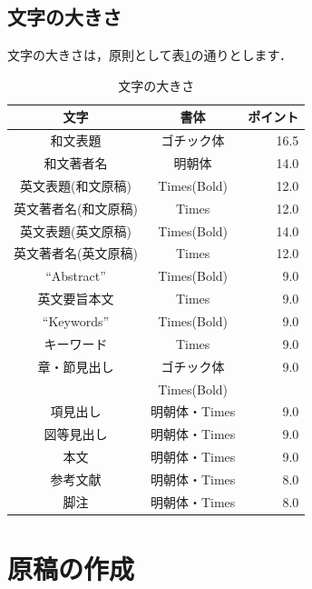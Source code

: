 \documentclass{hisken}
\begin{document}
\subsection{文字の大きさ}
文字の大きさは，原則として表\ref{table:charsize}の通りとします．

\begin{table}[tbh]
	\begin{center}
	\caption{文字の大きさ}		%
	\label{table:charsize}
	\begin{tabular}[hbt]{c c r}
	\hline
	\bf 文字 & \bf 書体 & \bf ポイント\\
	\hline
	和文表題 & ゴチック体 & 16.5\\
	和文著者名 & 明朝体 & 14.0\\
	英文表題(和文原稿) & Times(Bold) & 12.0\\
	英文著者名(和文原稿) & Times & 12.0\\
	英文表題(英文原稿) & Times(Bold) & 14.0\\
	英文著者名(英文原稿) & Times & 12.0\\
	``Abstract'' & Times(Bold) & 9.0\\
	英文要旨本文 & Times & 9.0\\
	``Keywords'' & Times(Bold) & 9.0 \\
	キーワード & Times & 9.0\\ \vspace{-0.7mm}
	章・節見出し & ゴチック体 & 9.0\\
	& Times(Bold) & \\
	項見出し & 明朝体・Times & 9.0\\
	図等見出し & 明朝体・Times & 9.0\\
	本文 & 明朝体・Times & 9.0\\
	参考文献 & 明朝体・Times & 8.0\\ \vspace{-0.7mm}
	脚注 & 明朝体・Times &  8.0\\
	\hline
	\end{tabular}
	\end{center}
\end{table}



\section{原稿の作成}
\end{document}

